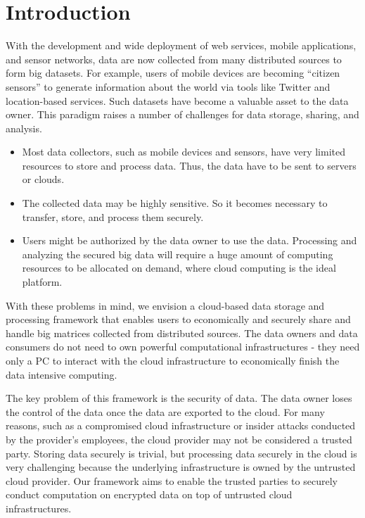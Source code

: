 \documentclass[10pt, conference, compsocconf]{IEEEtran}
\begin{document}
\section{Introduction}
With the development and wide deployment of web services, mobile applications, and sensor networks, data are now collected from many distributed sources to form big datasets. For example, users of mobile devices are becoming ``citizen sensors'' \cite{goodchild07} to generate information about the world via tools like Twitter and location-based services. Such datasets have become a valuable asset to the data owner. 
This paradigm raises a number of challenges for data storage, sharing, and analysis.
\begin{itemize}
\item Most data collectors, such as mobile devices and sensors, have very limited resources to store and process data. Thus, the data have to be sent to servers or clouds. 
\item The collected data may be highly sensitive. So it becomes necessary to transfer, store, and process them securely. 
\item Users might be authorized by the data owner to use the data. Processing and analyzing the secured big data will require a huge amount of computing resources to be allocated on demand, where cloud computing is the ideal platform.
\end{itemize}

With these problems in mind, we envision a cloud-based data storage and processing framework that enables users to economically and securely share and handle big matrices collected from distributed sources. The data owners and data consumers do not need to own powerful computational infrastructures - they need only a PC to interact with the cloud infrastructure to economically finish the data intensive computing. 

The key problem of this framework is the security of data. The data owner loses the control of the data once the data are exported to the cloud. For many reasons, such as a compromised cloud infrastructure or insider attacks conducted by the provider's employees, the cloud provider may not be considered a trusted party. Storing data securely is trivial, but processing data securely in the cloud is very challenging because the underlying infrastructure is owned by the untrusted cloud provider. Our framework aims to enable the trusted parties to securely conduct computation on encrypted data on top of untrusted cloud infrastructures. 
\end{document}
